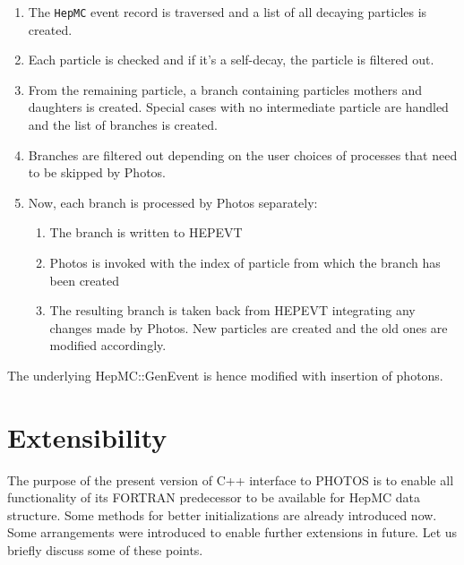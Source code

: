 \documentclass[]{Photos_interface_design}
\begin{document}
\begin{enumerate}
\item The {\tt HepMC} event record is traversed and a list of all decaying
      particles is created.
\item Each particle is checked and if it's a self-decay, the particle is filtered out.
\item From the remaining particle, a branch containing particles mothers and daughters
      is created. Special cases with no intermediate particle are handled and the
	  list of branches is created.
\item Branches are filtered out depending on the user choices of processes
      that need to be skipped by Photos.
\item Now, each branch is processed by Photos separately:

	\begin{enumerate}
  
	\item The branch is written to HEPEVT
	\item Photos is invoked with the index of particle from which the branch
	      has been created
	\item The resulting branch is taken back from HEPEVT integrating any changes
	      made by Photos. New particles are created and the old ones are modified
		  accordingly.

	\end{enumerate}

\end{enumerate}

The underlying HepMC::GenEvent is hence modified with insertion of photons.

\section{Extensibility}
 The purpose of the present version of C++ interface to PHOTOS is to enable 
all functionality of its FORTRAN predecessor to be available for HepMC data
structure. Some methods for better initializations are already introduced
now. Some arrangements were introduced to enable further
extensions in future. Let us briefly discuss some of these points.
 
\end{document}
